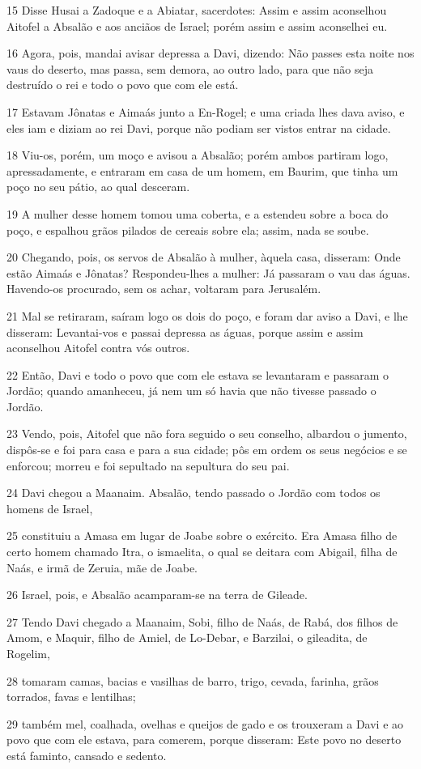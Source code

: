 \par 15 Disse Husai a Zadoque e a Abiatar, sacerdotes: Assim e assim aconselhou Aitofel a Absalão e aos anciãos de Israel; porém assim e assim aconselhei eu.
\par 16 Agora, pois, mandai avisar depressa a Davi, dizendo: Não passes esta noite nos vaus do deserto, mas passa, sem demora, ao outro lado, para que não seja destruído o rei e todo o povo que com ele está.
\par 17 Estavam Jônatas e Aimaás junto a En-Rogel; e uma criada lhes dava aviso, e eles iam e diziam ao rei Davi, porque não podiam ser vistos entrar na cidade.
\par 18 Viu-os, porém, um moço e avisou a Absalão; porém ambos partiram logo, apressadamente, e entraram em casa de um homem, em Baurim, que tinha um poço no seu pátio, ao qual desceram.
\par 19 A mulher desse homem tomou uma coberta, e a estendeu sobre a boca do poço, e espalhou grãos pilados de cereais sobre ela; assim, nada se soube.
\par 20 Chegando, pois, os servos de Absalão à mulher, àquela casa, disseram: Onde estão Aimaás e Jônatas? Respondeu-lhes a mulher: Já passaram o vau das águas. Havendo-os procurado, sem os achar, voltaram para Jerusalém.
\par 21 Mal se retiraram, saíram logo os dois do poço, e foram dar aviso a Davi, e lhe disseram: Levantai-vos e passai depressa as águas, porque assim e assim aconselhou Aitofel contra vós outros.
\par 22 Então, Davi e todo o povo que com ele estava se levantaram e passaram o Jordão; quando amanheceu, já nem um só havia que não tivesse passado o Jordão.
\par 23 Vendo, pois, Aitofel que não fora seguido o seu conselho, albardou o jumento, dispôs-se e foi para casa e para a sua cidade; pôs em ordem os seus negócios e se enforcou; morreu e foi sepultado na sepultura do seu pai.
\par 24 Davi chegou a Maanaim. Absalão, tendo passado o Jordão com todos os homens de Israel,
\par 25 constituiu a Amasa em lugar de Joabe sobre o exército. Era Amasa filho de certo homem chamado Itra, o ismaelita, o qual se deitara com Abigail, filha de Naás, e irmã de Zeruia, mãe de Joabe.
\par 26 Israel, pois, e Absalão acamparam-se na terra de Gileade.
\par 27 Tendo Davi chegado a Maanaim, Sobi, filho de Naás, de Rabá, dos filhos de Amom, e Maquir, filho de Amiel, de Lo-Debar, e Barzilai, o gileadita, de Rogelim,
\par 28 tomaram camas, bacias e vasilhas de barro, trigo, cevada, farinha, grãos torrados, favas e lentilhas;
\par 29 também mel, coalhada, ovelhas e queijos de gado e os trouxeram a Davi e ao povo que com ele estava, para comerem, porque disseram: Este povo no deserto está faminto, cansado e sedento.

